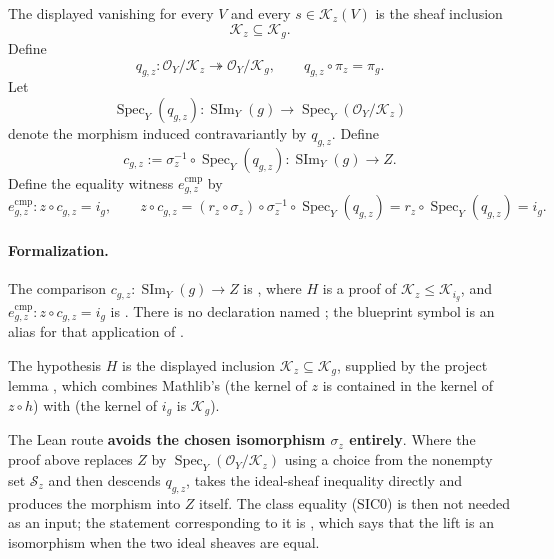 \begin{definition}
\[  \]
  The displayed vanishing for every $V$ and every
  $s\in\mathcal K_z(V)$ is the sheaf inclusion
  \[
    \mathcal K_z\subseteq\mathcal K_g.
  \]
  Define
  \[
    q_{g,z}\colon\mathcal O_Y/\mathcal K_z
      \twoheadrightarrow\mathcal O_Y/\mathcal K_g,
    \qquad
    q_{g,z}\circ\pi_z=\pi_g.
  \]
  Let
  \[
    \operatorname{Spec}_Y(q_{g,z})\colon
      \operatorname{SIm}_Y(g)\longrightarrow
      \operatorname{Spec}_Y(\mathcal O_Y/\mathcal K_z)
  \]
  denote the morphism induced contravariantly by $q_{g,z}$.  Define
  \[
    c_{g,z}:=\sigma_z^{-1}\circ\operatorname{Spec}_Y(q_{g,z})
      \colon\operatorname{SIm}_Y(g)\longrightarrow Z.
  \]
  Define the equality witness $e_{g,z}^{\mathrm{cmp}}$ by
  \[
    e_{g,z}^{\mathrm{cmp}}\colon z\circ c_{g,z}=i_g,
    \qquad
    z\circ c_{g,z}
      =(r_z\circ\sigma_z)\circ\sigma_z^{-1}
        \circ\operatorname{Spec}_Y(q_{g,z})
      =r_z\circ\operatorname{Spec}_Y(q_{g,z})
      =i_g.
  \]

  \paragraph{Formalization.}
  The comparison $c_{g,z}\colon\operatorname{SIm}_Y(g)\to Z$ is
  \texttt{}, where $H$ is a proof
  of $\mathcal K_z\le\mathcal K_{i_g}$,
  and $e_{g,z}^{\mathrm{cmp}}\colon z\circ c_{g,z}=i_g$ is
  \texttt{}.  There is no declaration named
  \texttt{}; the blueprint symbol is an
  alias for that application of \texttt{}.

  The hypothesis $H$ is the displayed inclusion $\mathcal K_z\subseteq\mathcal K_g$, supplied
  by the project lemma
  \texttt{}, which combines
  Mathlib's \texttt{} (the kernel of $z$ is contained in
  the kernel of $z\circ h$) with
  \texttt{} (the kernel of $i_g$ is
  $\mathcal K_g$).

  The Lean route \textbf{avoids the chosen isomorphism $\sigma_z$ entirely}.  Where the proof
  above replaces $Z$ by $\operatorname{Spec}_Y(\mathcal O_Y/\mathcal K_z)$ using a choice from
  the nonempty set $\mathscr S_z$ and then descends $q_{g,z}$,
  \texttt{} takes the ideal-sheaf inequality directly and produces the
  morphism into $Z$ itself.  The class equality (SIC0) is then not needed as an input; the
  statement corresponding to it is
  \texttt{}, which says that the lift is an
  isomorphism when the two ideal sheaves are equal.
\end{definition}

